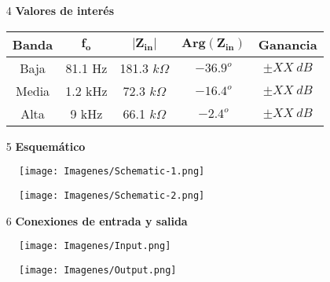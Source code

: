 \begin{multicols}{2}
\begin{enumerate}
	\item[4] \textbf{Valores de interés}
	\begin{table}[H]
		\begin{tabular}{ccccc}
			\hline			
			\textbf{Banda} & $\mathbf{f_o}$ & $\mathbf{|Z_{in}|}$ & $\mathbf{Arg\left(Z_{in}\right)}$ & \textbf{Ganancia} \\
			\hline
			Baja           & 81.1 Hz                     & 181.3 $k\Omega$     & $-36.9^o$                           & $\pm XX \ dB$          \\
			Media          & 1.2 kHz                     & 72.3 $k\Omega$      & $-16.4^o$                           & $\pm XX \ dB$          \\
			Alta           & 9 kHz                       & 66.1 $k\Omega$      & $-2.4^o$                            & $\pm XX \ dB$         	\\
			\hline
		\end{tabular}
	\end{table}

\end{enumerate}
\end{multicols}

\begin{enumerate}
	\item[5] \textbf{Esquemático}\\
\end{enumerate}

\begin{multicols}{2}
\centering
	\begin{figure}[H]
		\texttt{[image: Imagenes/Schematic-1.png]}
	\end{figure}
	\begin{figure}[H]
			\texttt{[image: Imagenes/Schematic-2.png]}
	\end{figure}
\end{multicols}

\begin{enumerate}
	\item[6] \textbf{Conexiones de entrada y salida}\\
\end{enumerate}
\begin{multicols}{2}
	\begin{figure}[H]
		\texttt{[image: Imagenes/Input.png]}
	\end{figure}
	\begin{figure}[H]
			\texttt{[image: Imagenes/Output.png]}
	\end{figure}
\end{multicols}
 

